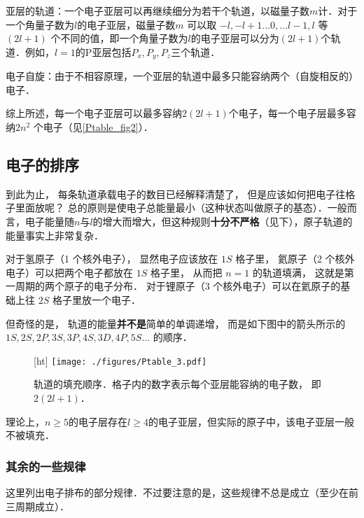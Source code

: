 亚层的轨道：一个电子亚层可以再继续细分为若干个轨道，以磁量子数$m$计．对于一个角量子数为$l$的电子亚层，磁量子数$m$ 可以取 $ - l, - l + 1...0,...l - 1,l$ 等 $(2l + 1)$ 个不同的值，即一个角量子数为$l$的电子亚层可以分为$(2l+1)$个轨道．例如，$l=1$的P亚层包括$P_x, P_y, P_z$三个轨道．

电子自旋：由于不相容原理，一个亚层的轨道中最多只能容纳两个（自旋相反的）电子．

综上所述，每一个电子亚层可以最多容纳$2(2l+1)$个电子，每一个电子层最多容纳$2n^2$ 个电子（见\autoref{Ptable_fig2}）．%

\subsection{电子的排序}
到此为止， 每条轨道承载电子的数目已经解释清楚了， 但是应该如何把电子往格子里面放呢？ 总的原则是使电子总能量最小（这种状态叫做原子的基态）．一般而言，电子能量随$n$与$l$的增大而增大，但这种规则\textbf{十分不严格}（见下），原子轨道的能量事实上非常复杂．

对于氢原子（1 个核外电子）， 显然电子应该放在 $1S$ 格子里， 氦原子（2 个核外电子）可以把两个电子都放在 $1S$ 格子里， 从而把 $n=1$ 的轨道填满， 这就是第一周期的两个原子的电子分布． 对于锂原子（3 个核外电子）可以在氦原子的基础上往 $2S$ 格子里放一个电子． 

但奇怪的是， 轨道的能量\textbf{并不是}简单的单调递增， 而是如下图中的箭头所示的 $1S, 2S, 2P, 3S, 3P, 4S, 3D, 4P, 5S\dots$ 的顺序． 
\begin{figure}\label{Ptable_fig2}[ht]
\centering
\texttt{[image: ./figures/Ptable\_3.pdf]}
\caption{轨道的填充顺序．格子内的数字表示每个亚层能容纳的电子数， 即 $2(2l + 1)$．} 
\end{figure}


理论上，$n\ge5$的电子层存在$l\ge4$的电子亚层，但实际的原子中，该电子亚层一般不被填充．

\subsubsection{其余的一些规律}
这里列出电子排布的部分规律．不过要注意的是，这些规律不总是成立（至少在前三周期成立）．

